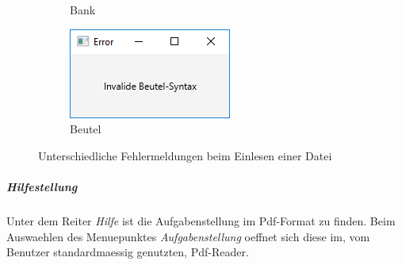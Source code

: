 \begin{figure}
\begin{subfigure}[b]{0.35\textwidth}
            \caption[]%
            {{\small Bank}}    
            \label{fig:mean and std of net34}
        \end{subfigure}
        \quad
        \begin{subfigure}[b]{0.35\textwidth}   
            \centering 
            \includegraphics[width=\textwidth]{screenshots/screenshot_ErrorBeutel}
            \caption[]%
            {{\small Beutel}}    
            \label{fig:mean and std of net44}
        \end{subfigure}
        \caption
        {\small Unterschiedliche Fehlermeldungen beim Einlesen einer Datei} 
        \label{fig:mean and std of nets}
    \end{figure}

\subparagraph{Hilfestellung}
Unter dem Reiter \emph{Hilfe} ist die Aufgabenstellung im Pdf-Format zu finden. Beim Auswaehlen des Menuepunktes \emph{Aufgabenstellung} oeffnet sich diese im, vom Benutzer standardmaessig genutzten, Pdf-Reader. 

\clearpage
